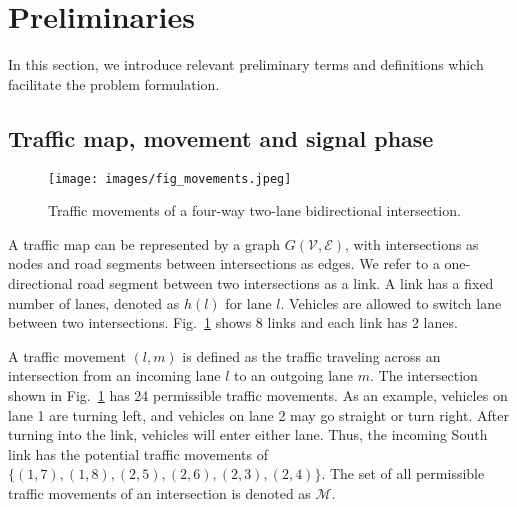 \section{Preliminaries}\label{sec_preliminaries}
In this section, we introduce relevant preliminary terms and definitions which facilitate the problem formulation.

 
\subsection{Traffic map, movement and signal phase}
\begin{figure}[h]
\texttt{[image: images/fig\_movements.jpeg]}
\centering
\caption{Traffic movements of a four-way two-lane bidirectional intersection.}
\label{fig_movements}
\end{figure}
A traffic map can be represented by a graph $G(\mathcal{V}, \mathcal{E})$, with intersections as nodes and road segments between intersections as edges. We refer to a one-directional road segment between two intersections as a link. A link has a fixed number of lanes, denoted as $h(l)$ for lane $l$. Vehicles are allowed to switch lane between two intersections. Fig.~\ref{fig_movements} shows 8 links and each link has 2 lanes. 
    
A traffic movement $(l,m)$ is defined as the traffic traveling across an intersection from an incoming lane $l$ to an outgoing lane $m$. The intersection shown in Fig.~\ref{fig_movements} has 24 permissible traffic movements. As an example, vehicles on lane 1 are turning left, and vehicles on lane 2 may go straight or turn right. After turning into the link, vehicles will enter either lane. Thus, the incoming South link has the potential traffic movements of $\{(1, 7), (1, 8), (2, 5), (2, 6), (2, 3), (2, 4)\}$. The set of all permissible traffic movements of an intersection is denoted as $\mathcal{M}$.

